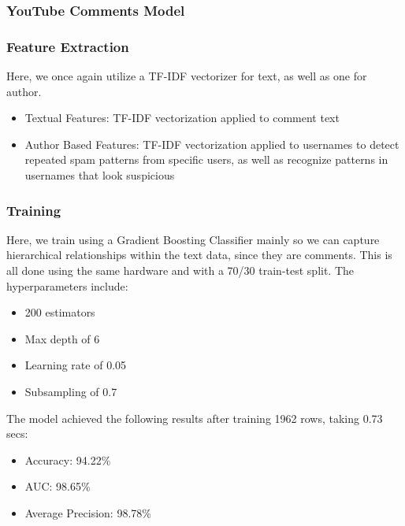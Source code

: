 \documentclass{article}
\begin{document}
\subsubsection{YouTube Comments Model}
\subsubsection*{Feature Extraction}

Here, we once again utilize a TF-IDF vectorizer for text, as well as one for author.

\begin{itemize}
    \item Textual Features: TF-IDF vectorization applied to comment text
    \item Author Based Features: TF-IDF vectorization applied to usernames to detect repeated spam patterns from specific users, as well as recognize patterns in usernames that look suspicious
\end{itemize}

\subsubsection*{Training}

Here, we train using a Gradient Boosting Classifier mainly so we can capture hierarchical relationships within the text data, since they are comments. This is all done using the same hardware and with a 70/30 train-test split. The hyperparameters include:

\begin{itemize}
    \item 200 estimators
    \item Max depth of 6
    \item Learning rate of 0.05
    \item Subsampling of 0.7
\end{itemize}

\noindent
The model achieved the following results after training 1962 rows, taking 0.73 secs:

\begin{itemize}
    \item Accuracy: 94.22\%
    \item AUC: 98.65\%
    \item Average Precision: 98.78\%
\end{itemize}
\end{document}
